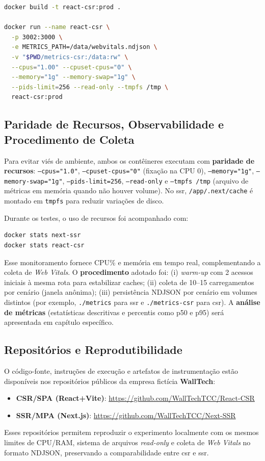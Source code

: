 \begin{lstlisting}[language=bash,caption={Build e execução do container CSR com limites e volume de métricas}]
docker build -t react-csr:prod .

docker run --name react-csr \
  -p 3002:3000 \
  -e METRICS_PATH=/data/webvitals.ndjson \
  -v "$PWD/metrics-csr:/data:rw" \
  --cpus="1.00" --cpuset-cpus="0" \
  --memory="1g" --memory-swap="1g" \
  --pids-limit=256 --read-only --tmpfs /tmp \
  react-csr:prod
\end{lstlisting}

\subsection{Paridade de Recursos, Observabilidade e Procedimento de Coleta}
\label{ssec:paridade-observabilidade}

Para evitar viés de ambiente, ambos os contêineres executam com \textbf{paridade de recursos}: \texttt{--cpus="1.0"}, \texttt{--cpuset-cpus="0"} (fixação na CPU 0), \texttt{--memory="1g"}, \texttt{--memory-swap="1g"}, \texttt{--pids-limit=256}, \texttt{--read-only} e \texttt{--tmpfs /tmp} (arquivo de métricas em memória quando não houver volume). No \acrshort{ssr}, \texttt{/app/.next/cache} é montado em \texttt{tmpfs} para reduzir variações de disco.

Durante os testes, o uso de recursos foi acompanhado com:
\begin{lstlisting}[language=bash]
docker stats next-ssr
docker stats react-csr
\end{lstlisting}
Esse monitoramento fornece CPU\% e memória em tempo real, complementando a coleta de \textit{Web Vitals}. O \textbf{procedimento} adotado foi:
(i) \textit{warm-up} com 2 acessos iniciais à mesma rota para estabilizar caches;
(ii) coleta de 10--15 carregamentos por cenário (janela anônima);
(iii) persistência NDJSON por cenário em volumes distintos (por exemplo, \texttt{./metrics} para \acrshort{ssr} e \texttt{./metrics-csr} para \acrshort{csr}).
A \textbf{análise de métricas} (estatísticas descritivas e percentis como p50 e p95) será apresentada em capítulo específico.

\subsection{Repositórios e Reprodutibilidade}
\label{ssec:repositorios-repro}
O código-fonte, instruções de execução e artefatos de instrumentação estão disponíveis nos repositórios públicos da empresa fictícia \textbf{WallTech}:
\begin{itemize}
  \item \textbf{CSR/SPA (React+Vite)}: \url{https://github.com/WallTechTCC/React-CSR}
  \item \textbf{SSR/MPA (Next.js)}: \url{https://github.com/WallTechTCC/Next-SSR}
\end{itemize}
Esses repositórios permitem reproduzir o experimento localmente com os mesmos limites de CPU/RAM, sistema de arquivos \textit{read-only} e coleta de \textit{Web Vitals} no formato NDJSON, preservando a comparabilidade entre \acrshort{csr} e \acrshort{ssr}.


